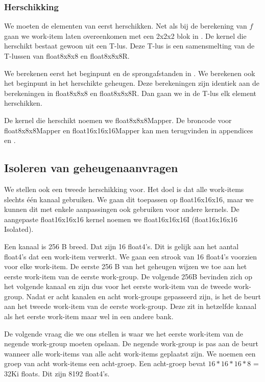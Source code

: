 
\subsubsection{Herschikking}
We moeten de elementen van \TT{} eerst herschikken. Net als bij de berekening van $f$ gaan we work-item laten overeenkomen met een 2x2x2 blok in \TT{}. De kernel die \TT{} herschikt bestaat gewoon uit een T-lus. Deze T-lus is een samensmelting van de T-lussen van float8x8x8 en float8x8x8R.

We berekenen eerst het beginpunt en de sprongafstanden in \TT{}. We berekenen ook het beginpunt in het herschikte geheugen.
Deze berekeningen zijn identiek aan de berekeningen in float8x8x8 en float8x8x8R. Dan gaan we in de T-lus elk element herschikken.

De kernel die \TT{} herschikt noemen we float8x8x8Mapper. De broncode voor float8x8x8Mapper en float16x16x16Mapper kan men terugvinden in appendices  en .

\subsection{Isoleren van geheugenaanvragen}
We stellen ook een tweede herschikking voor. Het doel is dat alle work-items slechts \'e\'en kanaal gebruiken. We gaan dit toepassen op float16x16x16, maar we kunnen dit met enkele aanpassingen ook gebruiken voor andere kernels. De aangepaste float16x16x16 kernel noemen we float16x16x16I (float16x16x16 Isolated).

Een kanaal is 256 B breed. Dat zijn 16 float4's. Dit is gelijk aan het aantal float4's dat een work-item verwerkt. We gaan een strook van 16 float4's voorzien voor elke work-item. De eerste 256 B van het geheugen wijzen we toe aan het eerste work-item van de eerste work-group. De volgende 256B bevinden zich op het volgende kanaal en zijn dus voor het eerste work-item van de tweede work-group. Nadat er acht kanalen en acht work-groups gepasseerd zijn, is het de beurt aan het tweede work-item van de eerste work-group. Deze zit in hetzelfde kanaal als het eerste work-item maar wel in een andere bank.

De volgende vraag die we ons stellen is waar we het eerste work-item van de negende work-group moeten opslaan. De negende work-group is pas aan de beurt wanneer alle work-items van alle acht work-items geplaatst zijn. We noemen een groep van acht work-items een acht-groep. Een acht-groep bevat $16 * 16 * 16 * 8$ = 32Ki floats. Dit zijn 8192 float4's.

